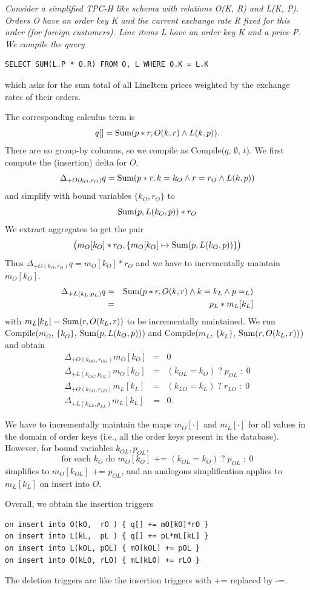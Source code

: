 \begin{example}\em
Consider a simplified TPC-H like schema with relations O(K, R)
and L(K, P). Orders O have an order key K and the current exchange rate R fixed for this order (for
foreign customers). Line items L have an {\em order} key
K and a price P. We compile the query
\begin{verbatim}
SELECT SUM(L.P * O.R) FROM O, L WHERE O.K = L.K
\end{verbatim}
which asks for the sum total of all LineItem prices weighted by the exchange
rates of their orders.

The corresponding calculus term is
\[
q[] = \mbox{Sum}(p*r, O(k, r) \land L(k, p)).
\]
There are no group-by columns, so we compile as Compile($q$, $\emptyset$, $t$).
We first compute the (insertion) delta for $O$,
\[
\Delta_{+O(k_{O}, r_{O})} q =
\mbox{Sum}(p*r, k=k_{O} \land r=r_{O} \land L(k, p))
\]
and simplify with bound variables $\{k_{O}, r_{O}\}$ to
\[
\mbox{Sum}(p, L(k_{O}, p))*r_{O}
\]
We extract aggregates to get the pair
\[
\big( m_O[k_{O}]*r_{O},
\{ m_O[k_{O}] \mapsto \mbox{Sum}(p, L(k_{O}, p)) \} \big)
\]
Thus $\Delta_{+O(k_{O}, r_{O})} q = m_O[k_{O}]*r_{O}$
and we have to incrementally maintain $m_O[k_O]$.
\begin{eqnarray*}
\Delta_{+L(k_{L}, p_{L})} q &=&
   \mbox{Sum}(p*r, O(k, r) \land k=k_{L} \land p=_{L}) \\
&=& p_{L} * m_L[k_{L}]
\end{eqnarray*}
with $m_L[k_{L}] = \mbox{Sum}(r, O(k_{L}, r))$ to be incrementally maintained.
We run Compile($m_O$, $\{k_{O}\}$, $\mbox{Sum}(p, L(k_{O}, p))$)
and Compile($m_L$, $\{k_{L}\}$, $\mbox{Sum}(r, O(k_{L}, r))$) and obtain
\begin{eqnarray*}
\Delta_{+O(k_{OO}, r_{OO})} m_O[k_O] &=& 0 \\
\Delta_{+L(k_{OL}, p_{OL})} m_O[k_O] &=& (k_{OL} = k_O) \;?\; p_{OL} \;:\; 0 \\
\Delta_{+O(k_{LO}, r_{LO})} m_L[k_L] &=& (k_{LO} = k_L) \;?\; r_{LO} \;:\; 0 \\
\Delta_{+L(k_{LL}, p_{LL})} m_L[k_L] &=& 0.
\end{eqnarray*}

We have to incrementally maintain the maps $m_O[\cdot]$ and
$m_L[\cdot]$ for all values in the domain of order keys (i.e., all the order
keys present in the database). However, for bound variables
$k_{OL}, p_{OL}$,
\[
\mbox{for each $k_O$ do $m_O[k_O]$ += $(k_{OL} = k_O) \;?\; p_{OL} \;:\; 0$}
\]
simplifies to $m_O[k_{OL}]$ += $p_{OL}$,
and an analogous simplification applies to $m_L[k_L]$ on insert into $O$.

Overall, we obtain the insertion triggers
\begin{verbatim}
on insert into O(kO,  rO ) { q[] += mO[kO]*rO }
on insert into L(kL,  pL ) { q[] += pL*mL[kL] }
on insert into L(kOL, pOL) { mO[kOL] += pOL }
on insert into O(kLO, rLO) { mL[kLO] += rLO }
\end{verbatim}
The deletion triggers are like the insertion triggers with += replaced by -=.
\punto
\end{example}


